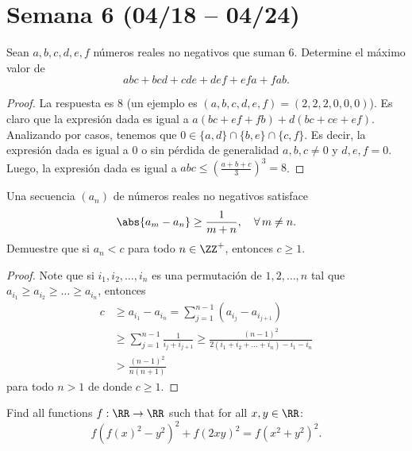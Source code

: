 \section{Semana 6 (04/18 -- 04/24)}


\begin{probEG}
  Sean $a,b,c,d,e,f$ números reales no negativos que suman $6$. Determine el
  máximo valor de
  \[abc+bcd+cde+def+efa+fab.\]
\end{probEG}

\begin{proof}
  La respuesta es $8$ (un ejemplo es $(a,b,c,d,e,f)=(2,2,2,0,0,0)$). Es claro
  que la expresión dada es igual a $a(bc+ef+fb)+d(bc+ce+ef)$. Analizando por
  casos, tenemos que $0\in\{a,d\}\cap\{b,e\}\cap\{c,f\}$. Es decir, la expresión
  dada es igual a $0$ o sin pérdida de generalidad $a,b,c\ne 0$ y $d,e,f=0$.
  Luego, la expresión dada es igual a $abc\le\left(\frac{a+b+c}{3}\right)^3=8$.
\end{proof}

\begin{probMR}
  Una secuencia $(a_n)$ de números reales no negativos satisface
  \[\abs{a_m-a_n}\ge\frac{1}{m+n},\quad\forall\,m\ne n.\]
  Demuestre que si $a_n<c$ para todo $n\in\ZZ^+$, entonces $c\ge 1$.
\end{probMR}

\begin{proof}
  Note que si $i_1,i_2,\dots,i_n$ es una permutación de $1,2,\dots,n$ tal que
  $a_{i_1}\ge a_{i_2}\ge\dots\ge a_{i_n}$, entonces
  \begin{align*}
    c
    &\ge a_{i_1}-a_{i_n}
    = \sum_{j=1}^{n-1}(a_{i_j}-a_{i_{j+1}}) \\
    &\ge \sum_{j=1}^{n-1}\frac{1}{i_j+i_{j+1}}
    \ge \frac{(n-1)^2}{2(i_1+i_2+\dots+i_n)-i_1-i_n} \\
    &> \frac{(n-1)^2}{n(n+1)}
  \end{align*}
  para todo $n>1$ de donde $c\ge 1$.
\end{proof}


\begin{problem}
  Find all functions $f:\RR\to\RR$ such that for all $x,y\in\RR$:
  \[f\left(f(x)^2-y^2\right)^2+f(2xy)^2=f\left(x^2+y^2\right)^2.\]
\end{problem}

